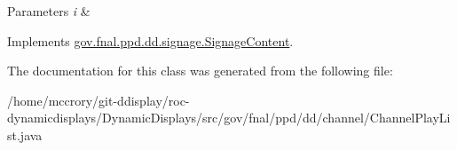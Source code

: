 \begin{DoxyParams}{Parameters}
{\em i} & \\
\hline
\end{DoxyParams}


Implements \hyperlink{interfacegov_1_1fnal_1_1ppd_1_1dd_1_1signage_1_1SignageContent_a59c75e24dcec3ea729297104328a7852}{gov.\-fnal.\-ppd.\-dd.\-signage.\-Signage\-Content}.



The documentation for this class was generated from the following file\-:\begin{DoxyCompactItemize}
\item 
/home/mccrory/git-\/ddisplay/roc-\/dynamicdisplays/\-Dynamic\-Displays/src/gov/fnal/ppd/dd/channel/Channel\-Play\-List.\-java\end{DoxyCompactItemize}
